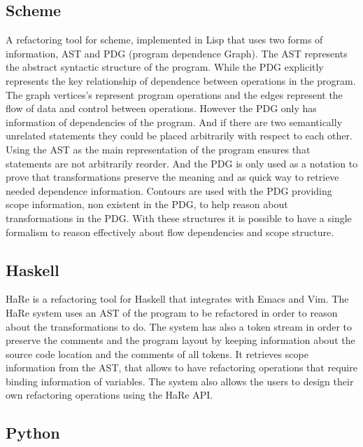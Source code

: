 \subsection{Scheme}
A refactoring tool \cite{griswold1991program} for scheme, implemented in Lisp that
uses two forms of information, AST and PDG (program dependence Graph).
The AST represents the abstract syntactic structure of the program.
While the PDG explicitly represents the key relationship of dependence between
operations in the program. %
The graph vertices's represent program operations and the edges represent the flow of
data and control between operations.
However the PDG only has information of dependencies of the program. And if there
are two semantically unrelated statements they could be placed arbitrarily with
respect to each other.
Using the AST as the main representation of the program ensures that statements
are not arbitrarily reorder.
And the PDG is only used as a notation to prove that transformations preserve
the meaning and as quick way to retrieve needed dependence information.
Contours are used with the PDG providing scope information, non existent in the PDG,
to help reason about transformations in the PDG.
With these structures it is possible to have a single formalism to reason effectively
about flow dependencies and scope structure.
\subsection{Haskell}
HaRe \cite{thompson2005refactoring} is a refactoring tool for Haskell that
integrates with Emacs and Vim.
The HaRe system uses an AST of the program to be
refactored in order to reason about the transformations to do.
The system has also a token stream in order to preserve the comments and the
program layout by keeping information about the source code location and the comments of all tokens.
It retrieves scope information from the AST, that allows to have refactoring operations that
require binding information of variables. %
The system also allows the users to design their own refactoring operations
using the HaRe API.
\subsection{Python}
